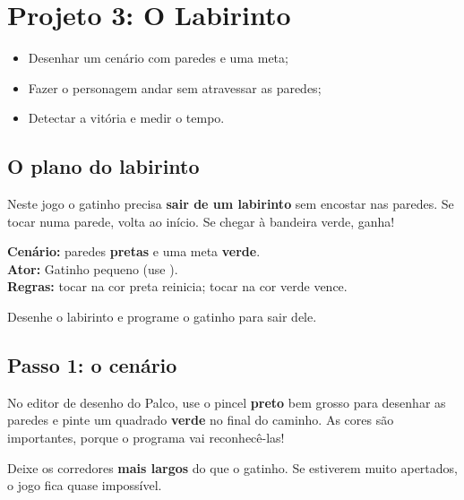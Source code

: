 \chapter{Projeto 3: O Labirinto}

\begin{objetivos}
\begin{itemize}
\item Desenhar um cenário com paredes e uma meta;
\item Fazer o personagem andar sem atravessar as paredes;
\item Detectar a vitória e medir o tempo.
\end{itemize}
\end{objetivos}

\section{O plano do labirinto}

Neste jogo o gatinho precisa \textbf{sair de um labirinto} sem encostar nas paredes. Se tocar numa parede, volta ao início. Se chegar à bandeira verde, ganha!

\begin{definicao}
\textbf{Cenário:} paredes \textbf{pretas} e uma meta \textbf{verde}.\\
\textbf{Ator:} Gatinho pequeno (use ).\\
\textbf{Regras:} tocar na cor preta reinicia; tocar na cor verde vence.
\end{definicao}

\begin{missao}
Desenhe o labirinto e programe o gatinho para sair dele.
\end{missao}

\section{Passo 1: o cenário}

No editor de desenho do Palco, use o pincel \textbf{preto} bem grosso para desenhar as paredes e pinte um quadrado \textbf{verde} no final do caminho. As cores são importantes, porque o programa vai reconhecê-las!

\begin{dica}
Deixe os corredores \textbf{mais largos} do que o gatinho. Se estiverem muito apertados, o jogo fica quase impossível.
\end{dica}

